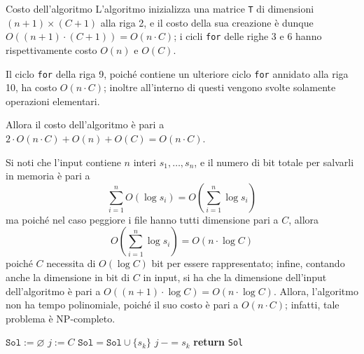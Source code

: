 \documentclass[a4paper, 12pt]{report}
\begin{document}
    \begin{framedobs}{Costo dell'algoritmo}
        L'algoritmo inizializza una matrice \texttt{T} di dimensioni $(n + 1) \times (C + 1)$ alla riga 2, e il costo della sua creazione è dunque $O((n + 1) \cdot (C + 1)) = O(n \cdot C)$; i cicli \texttt{for} delle righe 3 e 6 hanno rispettivamente costo $O(n)$ e $O(C)$.

        Il ciclo \texttt{for} della riga 9, poiché contiene un ulteriore ciclo \texttt{for} annidato alla riga 10, ha costo $O(n \cdot C)$; inoltre all'interno di questi vengono svolte solamente operazioni elementari.

        Allora il costo dell'algoritmo è pari a $2 \cdot O(n \cdot C) + O(n) + O(C) = O(n \cdot C)$.

        Si noti che l'input contiene $n$ interi $s_1, \ldots, s_n$, e il numero di bit totale per salvarli in memoria è pari a $$\displaystyle \sum_{i = 1}^n{O(\log s_i)} = O \left ( \sum_{i = 1}^n{\log s_i} \right )$$ ma poiché nel caso peggiore i file hanno tutti dimensione pari a $C$, allora $$O \left ( \sum_{i = 1}^n{\log s_i} \right ) = O(n \cdot \log C)$$ poiché $C$ necessita di $O(\log C)$ bit per essere rappresentato; infine, contando anche la dimensione in bit di $C$ in input, si ha che la dimensione dell'input dell'algoritmo è pari a $O((n + 1) \cdot \log C) = O(n \cdot \log C)$. Allora, l'algoritmo non ha tempo polinomiale, poiché il suo costo è pari a $O(n \cdot C)$; infatti, tale problema è NP-completo.
    \end{framedobs}

    \begin{algorithm}[H]
        \caption{
            Data una lista \texttt{S} di dimensioni di $n$ file, una memoria di capacità $C$, e la matrice costruita attraverso la funzione \texttt{fileAllocation} dell'\cref{fileallocation}, l'algoritmo restituisce un insieme di file che massimizza la memoria allocata; inoltre, i file hanno tutti dimensione inferiore a $C$.\\
            \textbf{Input}: \texttt{S} lista di dimensioni di file; $C$ capacità della memoria, tale che $\forall s_i \in \texttt{S} \quad s_i \le C$; \texttt{T} matrice prodotta precedentemente.\\
            \textbf{Output}: un insieme di file che massimizza la memoria allocata.
        }

        \begin{algorithmic}[1]
            \label{fileallocation2}
                \State $\texttt{Sol} := \varnothing$
                \State $j:= C$
                 
                        \State $\texttt{Sol} = \texttt{Sol} \cup \{s_k\}$
                        \State $j \ -= s_k$
                    \EndIf
                \EndFor
                \State \textbf{return} \texttt{Sol}
            \EndFunction
        \end{algorithmic}
    \end{algorithm}
\end{document}
